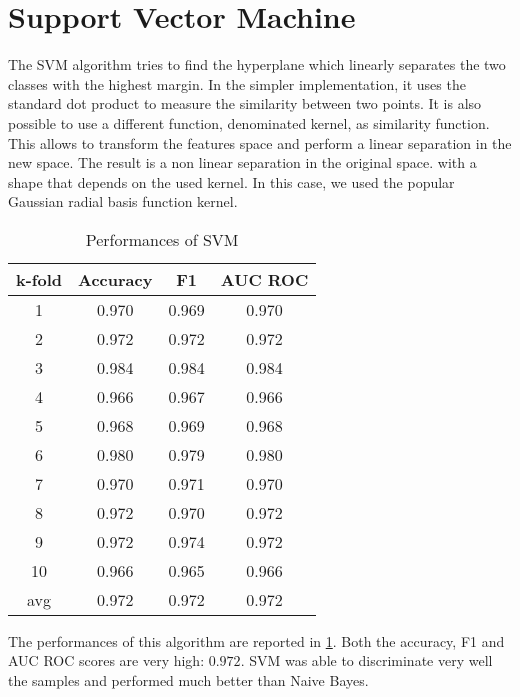 \section{Support Vector Machine}
\label{sec:svm}

The \ac{SVM} algorithm tries to find the hyperplane which linearly separates the two classes with the highest margin.
In the simpler implementation, it uses the standard dot product to measure the similarity between two points.
It is also possible to use a different function, denominated kernel, as similarity function.
This allows to transform the features space and perform a linear separation in the new space.
The result is a non linear separation in the original space. with a shape that depends on the used kernel.
In this case, we used the popular Gaussian radial basis function kernel.

\begin{table}
	\centering
	\caption{Performances of SVM}
	\label{tab:svm}
	\begin{tabular}{cccc}
		\toprule
			\multicolumn{1}{c}{k-fold} &
			\multicolumn{1}{c}{Accuracy} &
			\multicolumn{1}{c}{F1} &
			\multicolumn{1}{c}{AUC ROC} \\
		\midrule
			  1  & 0.970 & 0.969 & 0.970 \\
			  2  & 0.972 & 0.972 & 0.972 \\
			  3  & 0.984 & 0.984 & 0.984 \\
			  4  & 0.966 & 0.967 & 0.966 \\
			  5  & 0.968 & 0.969 & 0.968 \\
			  6  & 0.980 & 0.979 & 0.980 \\
			  7  & 0.970 & 0.971 & 0.970 \\
			  8  & 0.972 & 0.970 & 0.972 \\
			  9  & 0.972 & 0.974 & 0.972 \\
			 10  & 0.966 & 0.965 & 0.966 \\[2pt]
			\hline
			 avg & 0.972 & 0.972 & 0.972 \Tstrut\Bstrut\\
		\bottomrule
	\end{tabular}
\end{table}

The performances of this algorithm are reported in \cref{tab:svm}.
Both the accuracy, F1 and AUC ROC scores are very high: $0.972$.
\ac{SVM} was able to discriminate very well the samples and performed much better than Naive Bayes.
